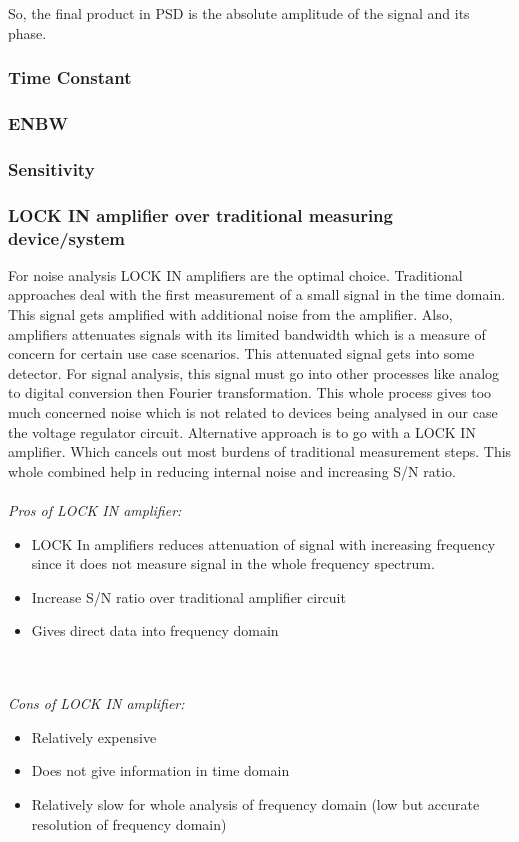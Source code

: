 \documentclass[draft,12pt]{article}
\begin{document}
So, the final product in PSD is the absolute amplitude of the signal and its phase. 

\subsubsection{Time Constant }

\subsubsection{ENBW}

\subsubsection{Sensitivity} 

\subsubsection{LOCK IN amplifier over traditional measuring device/system}

For noise analysis LOCK IN amplifiers are the optimal choice. Traditional approaches deal with the first measurement of a small signal in the time domain. This signal gets amplified with additional noise from the amplifier. Also, amplifiers attenuates signals with its limited bandwidth which is a measure of concern for certain use case scenarios. This attenuated signal gets into some detector. For signal analysis, this signal must go into other  processes like analog to digital conversion then Fourier transformation. This whole process gives too much concerned noise which is not related to devices being analysed in our case the voltage regulator circuit. Alternative approach is to go with a LOCK IN amplifier. Which cancels out most burdens of traditional measurement steps. This whole combined help in reducing internal noise and increasing S/N ratio.
\\
\\
\emph{\large Pros of LOCK IN amplifier:}
\begin{itemize}
\item LOCK In amplifiers reduces attenuation of signal with increasing frequency since it does not measure signal in the whole frequency spectrum.
\item Increase S/N ratio over traditional amplifier circuit
\item Gives direct data into frequency domain
\end{itemize}\\
\\
\emph {\large Cons of LOCK IN amplifier:}
\begin{itemize}
\item Relatively expensive
\item Does not give information in time domain
\item Relatively slow for whole analysis of frequency domain (low but accurate resolution of frequency domain)
\end{itemize}
\end{document}
